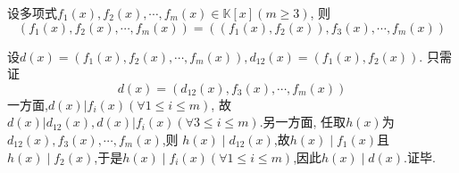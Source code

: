 \begin{green}
\begin{lemma}[多个多项式的最大公因式求取]\label{lem:多个多项式的最大公因式求取}
    设多项式$f_1\left(x\right),f_2\left(x\right),\cdots,f_m\left(x\right)\in\mathbb{K}\left[x\right]\left(m\geqslant 3\right)$,
    则\[
    \left(f_1\left(x\right),f_2\left(x\right),\cdots,f_m\left(x\right)\right)=\left(\left(f_1\left(x\right),f_2\left(x\right)\right),f_3\left(x\right),\cdots,f_m\left(x\right)\right)
    \]
\end{lemma}
\begin{Proof}
设$d\left(x\right)=\left(f_1\left(x\right),f_2\left(x\right),\cdots,f_m\left(x\right)\right),d_{12}\left(x\right)=\left(f_1\left(x\right),f_2\left(x\right)\right)$.
只需证\[
d\left(x\right)=\left(d_{12}\left(x\right),f_3\left(x\right),\cdots,f_m\left(x\right)\right)
\]
一方面,$d\left(x\right)|f_i\left(x\right)\left(\forall 1\leqslant i\leqslant m\right)$,
故$d\left(x\right)|d_{12}\left(x\right),d\left(x\right)|f_i\left(x\right)\left(\forall 3\leqslant i\leqslant m\right)$.另一方面,
任取$h\left(x\right)$为$d_{12}\left(x\right),f_3\left(x\right),\cdots,f_m\left(x\right)$,则
$h\left(x\right)\mid d_{12}\left(x\right)$,故$h\left(x\right)\mid f_1\left(x\right)$且
$h\left(x\right)\mid f_2\left(x\right)$,于是$h\left(x\right)\mid f_i\left(x\right)\left(\forall 1\leqslant i\leqslant m\right)$,因此$h\left(x\right)\mid d\left(x\right)$.证毕.
\end{Proof}
\end{green}
